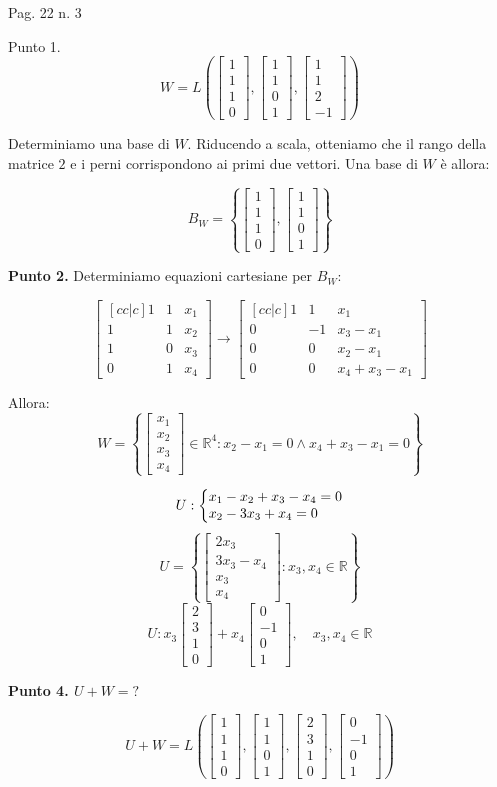 \documentclass{article}
\makeatletter
\newcommand*{\sys}[1]{\left\{\begin{array}{@{}l@{}}#1\end{array}\right.}
\newcommand*{\m}[1]{\begin{bmatrix}#1\end{bmatrix}}
\makeatother
\begin{document}
Pag. 22 n. 3

Punto 1.
\[W=L\left(\m{1\\1\\1\\0},\m{1\\1\\0\\1},\m{1\\1\\2\\-1}\right)\]

Determiniamo una base di $W$. Riducendo a scala, otteniamo che il rango della
matrice $2$ e i perni corrispondono ai primi due vettori. Una base di $W$ è
allora:

\[B_W = \left\{\m{1\\1\\1\\0},\m{1\\1\\0\\1}\right\}\]

\textbf{Punto 2.} Determiniamo equazioni cartesiane per $B_W$:

\[
    \m{[cc|c] 1&1&x_1\\1&1&x_2\\1&0&x_3\\0&1&x_4}
    \longrightarrow
    \m{[cc|c] 1&1&x_1\\0&-1&x_3-x_1\\0&0&x_2-x_1\\0&0&x_4+x_3-x_1}
\]

Allora:
\[W = \left\{
    \m{x_1\\x_2\\x_3\\x_4}\in\mathbb{R}^4:
    x_2-x_1 = 0 \wedge x_4+x_3-x_1=0
\right\}\]

\[U: \sys{x_1-x_2+x_3-x_4=0\\x_2-3x_3+x_4=0}\]
\[U = \left\{
    \m{2x_3\\3x_3-x_4\\x_3\\x_4}:
    x_3,x_4\in\mathbb{R}
\right\}\]
\[U: x_3\m{2\\3\\1\\0}+x_4\m{0\\-1\\0\\1},\quad x_3,x_4\in\mathbb{R}\]

\textbf{Punto 4. $U+W=?$}

\[U+W=L\left(\m{1\\1\\1\\0},\m{1\\1\\0\\1},\m{2\\3\\1\\0},\m{0\\-1\\0\\1}\right)\]
\end{document}
